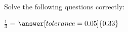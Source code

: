 \documentclass{ximera}
\begin{document}

    
    \displayOutcomes

    
    \begin{exercise} Solve the following questions correctly:

            $\frac{1}{3}$ =  $\answer[tolerance=0.05]{0.33}$  

    \end{exercise}
\end{document}

